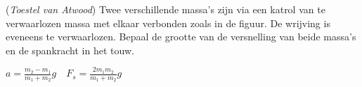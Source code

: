 
\begin{exercise}





\begin{minipage}[t]{.7\textwidth}
(\emph{Toestel van Atwood}) Twee verschillende massa's zijn via een katrol van te verwaarlozen massa met elkaar verbonden zoals in de figuur. De wrijving is eveneens te verwaarlozen. 
\newline
\newline
Bepaal de grootte van de versnelling van beide massa's en de spankracht in het touw.
\end{minipage}
\hfill
\begin{minipage}[t]{.2\textwidth}
\flushright
\end{minipage}

\begin{oplossing}
$a=\frac{m_2-m_1}{m_1+m_2}g \quad F_s=\frac{2m_1m_2}{m_1+m_2}g$
\end{oplossing}

\end{exercise}
